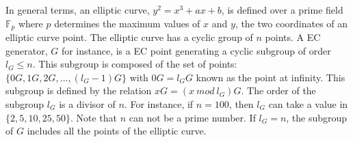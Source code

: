 In general terms, an elliptic curve, $y^2 = x^3 + ax + b$, is defined over a prime field $\mathbb{F}_p$ where $p$ determines the maximum values of $x$ and $y$, the two coordinates of an elliptic curve point. The elliptic curve has a cyclic group of $n$ points. A EC generator, $G$ for instance, is a EC point generating a cyclic subgroup of order $l_G \leq n$. This subgroup is composed of the set of points: $\{0G, 1G, 2G,...,(l_G-1)G\}$ with $0G = l_GG$ known as the point at infinity. This subgroup is defined by the relation $xG = (x ~mod~l_G)G$. The order of the subgroup $l_G$ is a divisor of $n$. For instance, if $n = 100$, then $l_G$ can take a value in $\{2, 5, 10, 25, 50\}$. Note that $n$ can not be a prime number. If $l_G = n$, the subgroup of $G$ includes all the points of the elliptic curve.\\
